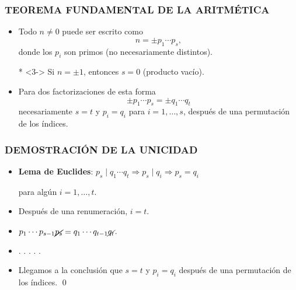 \begin{frame}
  \frametitle{TEOREMA FUNDAMENTAL DE LA ARITMÉTICA}

  \begin{itemize}
  \item<2-> Todo $n \ne 0$ puede ser escrito como
    $$n = \pm p_1 \cdots p_s,$$
    donde los $p_i$ son primos (no necesariamente distintos).

  \item[*]<3-> Si $n = \pm 1$, entonces $s = 0$ (producto vacío).

  \item<4-> Para dos factorizaciones de esta forma
    $$\pm p_1 \cdots p_s = \pm q_1 \cdots q_t$$
    necesariamente $s = t$ y $p_i = q_i$ para $i = 1,\ldots,s$,
    después de una permutación de los índices.
  \end{itemize}
\end{frame}

\begin{frame}
  \frametitle{DEMOSTRACIÓN DE LA UNICIDAD}


  \begin{itemize}
  \item<3-> \textbf{Lema de Euclides}:
    $p_s \mid q_1 \cdots q_t \Longrightarrow p_s \mid q_i \Longrightarrow p_s = q_i$

    para algún $i = 1,\ldots,t$.

  \item<4-> Después de una renumeración, $i = t$.

  \item<5-> $p_1 \cdots p_{s-1} \cancel{p_s} = q_1 \cdots q_{t-1} \cancel{q_t}$.

  \item<6-> . . . . .

  \item<7-> Llegamos a la conclusión que $s = t$ y $p_i = q_i$ después de una
    permutación de los índices. \qed
  \end{itemize}
\end{frame}

